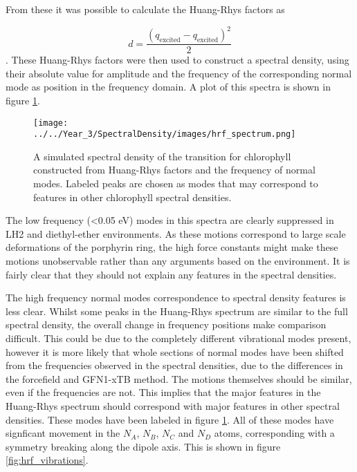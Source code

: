 From these it was possible to calculate the Huang-Rhys factors as

\begin{equation}
    d = \frac{\left(q_{\text{excited}} - q_{\text{excited}}\right)^2}{2}
\end{equation}
%
. These Huang-Rhys factors were then used to construct a spectral density, using
their absolute value for amplitude and the frequency of the corresponding normal
mode as position in the frequency domain. A plot of this spectra is shown in figure 
\ref{fig:specdens_hrf}.

\begin{figure}
    \centering
    \texttt{[image: ../../Year\_3/SpectralDensity/images/hrf\_spectrum.png]}
    \label{fig:specdens_hrf}
    \caption{A simulated spectral density of the \Qy transition for chlorophyll 
    constructed from Huang-Rhys factors and the frequency of normal modes. Labeled
    peaks are chosen as modes that may correspond to features in other chlorophyll
    spectral densities.}
\end{figure}

The low frequency (<0.05 eV) modes in this spectra are clearly suppressed in LH2
and diethyl-ether environments. As these motions correspond to large scale deformations 
of the porphyrin ring, the high force constants might make these motions unobservable
rather than any arguments based on the environment. It is fairly clear that they
should not explain any features in the spectral densities.

The high frequency normal modes correspondence to spectral density features is less
clear. Whilst some peaks in the Huang-Rhys spectrum are similar to the full spectral
density, the overall change in frequency positions make comparison difficult. This
could be due to the completely different vibrational modes present, however it is 
more likely that whole sections of normal modes have been shifted from the frequencies
observed in the spectral densities, due to the differences in the forcefield and
GFN1-xTB method. The motions themselves should be similar, even if the frequencies 
are not. This implies that the major features in the Huang-Rhys spectrum should 
correspond with major features in other spectral densities. These modes have been
labeled in figure \ref{fig:specdens_hrf}. All of these modes have signficant movement
in the $N_A$, $N_B$, $N_C$ and $N_D$ atoms, corresponding with a symmetry breaking
along the \Qy dipole axis. This is shown in figure \ref{fig:hrf_vibrations}.

